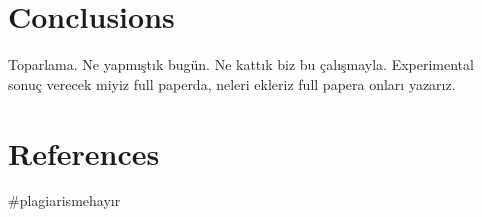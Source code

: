 \documentclass[a4paper,11pt]{article}
\begin{document}
\section{\normalsize\textbf{Conclusions}}
Toparlama. Ne yapmıştık bugün. Ne kattık biz bu çalışmayla. Experimental sonuç verecek miyiz full paperda, neleri ekleriz full papera onları yazarız.

\section{\normalsize\textbf{References}}
\#plagiarismehayır
\end{document}
